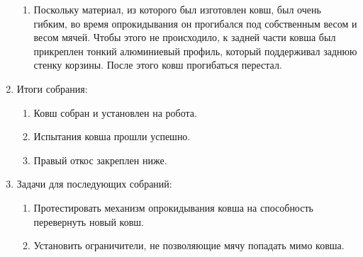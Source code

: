 \begin{enumerate}
\begin{enumerate}
      \item Поскольку материал, из которого был изготовлен ковш, был очень гибким, во время опрокидывания он прогибался под собственным весом и весом мячей. Чтобы этого не происходило, к задней части ковша был прикреплен тонкий алюминиевый профиль, который поддерживал заднюю стенку корзины. После этого ковш прогибаться перестал.
      
    \end{enumerate}
    
	\item Итоги собрания: 
	\begin{enumerate}
	  \item Ковш собран и установлен на робота.
	  
	  \item Испытания ковша прошли успешно.
	  
	  \item Правый откос закреплен ниже.
	  
    \end{enumerate}
    
	\item Задачи для последующих собраний:
	\begin{enumerate}
	  \item Протестировать механизм опрокидывания ковша на способность перевернуть новый ковш.
	  
	  \item Установить ограничители, не позволяющие мячу попадать мимо ковша.
	  	  
    \end{enumerate}     
\end{enumerate}
\fillpage